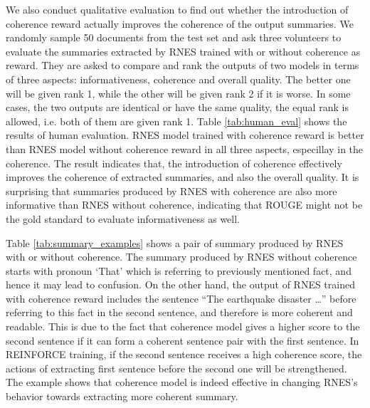 \documentclass[letterpaper]{article} %
\begin{document}
	We also conduct qualitative evaluation to find out whether the introduction of coherence reward actually improves the coherence of the output summaries. We randomly sample 50 documents from the test set and ask three volunteers to evaluate the summaries extracted by RNES trained with or without coherence as reward. They are asked to compare and rank the outputs of two models in terms of three aspects: informativeness, coherence and overall quality. The better one will be given rank 1, while the other will be given rank 2 if it is worse. In some cases, the two outputs are identical or have the same quality, the equal rank is allowed, i.e. both of them are given rank 1. Table \ref{tab:human_eval} shows the results of human evaluation. RNES model trained with coherence reward is better than RNES model without coherence reward in all three aspects, especillay in the coherence. The result indicates that, the introduction of coherence effectively improves the coherence of extracted summaries, and also the overall quality. It is surprising that summaries produced by RNES with coherence are also more informative than RNES without coherence, indicating that ROUGE might not be the gold standard to evaluate informativeness as well. 
	
	
	
	Table \ref{tab:summary_examples} shows a pair of summary produced by RNES with or without coherence. The summary produced by RNES without coherence starts with pronoun `That' which is referring to previously mentioned fact, and hence it may lead to confusion. On the other hand, the output of RNES trained with coherence reward includes the sentence ``The earthquake disaster \dots'' before referring to this fact in the second sentence, and therefore is more coherent and readable. This is due to the fact that coherence model gives a higher score to the second sentence if it can form a coherent sentence pair with the first sentence. In REINFORCE training, if the second sentence receives a high coherence score, the actions of extracting first sentence before the second one will be strengthened. The example shows that coherence model is indeed effective in changing RNES's behavior towards extracting more coherent summary.
		
\end{document}
